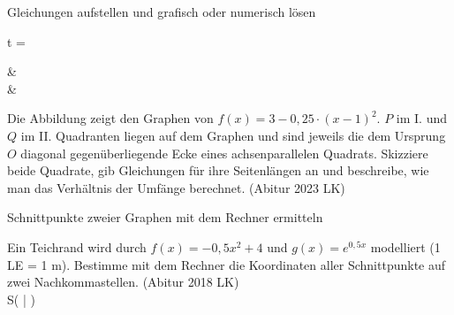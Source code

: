 \begin{aufgabe}{Gleichungen aufstellen und grafisch oder numerisch lösen}
\begin{teile}
\begin{ksys}[xmin=0,xmax=8,ymin=0,ymax=4]  \end{ksys}
t = \leerfeld
\end{teile}
\begin{gleichungsraster}[2]
 &
 \\
 &
\end{gleichungsraster}
\begin{teile}
\teil Die Abbildung zeigt den Graphen von $f(x) = 3 - 0{,}25 \cdot (x - 1)^2$. $P$ im I. und $Q$ im II. Quadranten liegen auf dem Graphen und sind jeweils die dem Ursprung $O$ diagonal gegenüberliegende Ecke eines achsenparallelen Quadrats. Skizziere beide Quadrate, gib Gleichungen für ihre Seitenlängen an und beschreibe, wie man das Verhältnis der Umfänge berechnet. \hfill (Abitur 2023 LK)

\begin{ksys}[xmin=-4,xmax=4,ymin=-1,ymax=4]  \end{ksys}
\end{teile}
\end{aufgabe}

\begin{aufgabe}{Schnittpunkte zweier Graphen mit dem Rechner ermitteln}
\begin{teile}
\teil Ein Teichrand wird durch $f(x) = -0{,}5x^2 + 4$ und $g(x) = e^{0{,}5x}$ modelliert (1 LE = 1 m). Bestimme mit dem Rechner die Koordinaten aller Schnittpunkte auf zwei Nachkommastellen. \hfill (Abitur 2018 LK) \\ S( \leerfeld | \leerfeld )
\end{teile}
\end{aufgabe}

